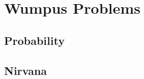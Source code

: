 \setcounter{maxpage}{4}

\newpage
%

\newpage
%

\newpage
\section*{Wumpus Problems}
\subsection*{Probability}

\subsection*{Nirvana}

